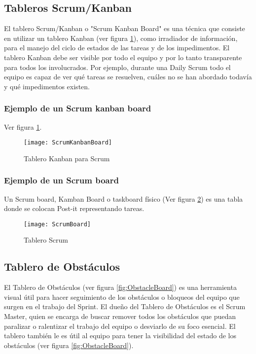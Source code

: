 \subsection{Tableros Scrum/Kanban}

El tablero Scrum/Kanban o "Scrum Kanban Board" es una técnica que consiste en utilizar un tablero Kanban (ver figura \ref{fig:ScrumKanbanBoard}), como irradiador de información, para el manejo del ciclo de estados de las tareas y de los impedimentos. El tablero Kanban debe ser visible por todo el equipo y por lo tanto transparente para todos los involucrados. Por ejemplo, durante una Daily Scrum todo el equipo es capaz de ver qué tareas se resuelven, cuáles no se han abordado todavía y qué impedimentos existen.

\subsubsection{Ejemplo de un Scrum kanban board}

Ver figura \ref{fig:ScrumKanbanBoard}.

\begin{figure}[h]
  \centering
  \texttt{[image: ScrumKanbanBoard]}
  \caption{Tablero Kanban para Scrum}
  \centering
  \label{fig:ScrumKanbanBoard} %
\end{figure}

\subsubsection{Ejemplo de un Scrum board}

Un Scrum board, Kamban Board o taskboard físico (Ver figura \ref{fig:ScrumBoard}) es una tabla donde se colocan Post-it representando tareas.

\begin{figure}[h]
  \centering
  \texttt{[image: ScrumBoard]}
  \caption{Tablero Scrum}
  \centering
  \label{fig:ScrumBoard} %
\end{figure}

\subsection{Tablero de Obstáculos}

El Tablero de Obstáculos (ver figura \ref{fig:ObstacleBoard}) es una herramienta visual útil para hacer seguimiento de los obstáculos o bloqueos del equipo que surgen en el trabajo del Sprint. El dueño del Tablero de Obstáculos es el Scrum Master, quien se encarga de buscar remover todos los obstáculos que puedan paralizar o ralentizar el trabajo del equipo o desviarlo de su foco esencial. El tablero también le es útil al equipo para tener la visibilidad del estado de los obstáculos (ver figura \ref{fig:ObstacleBoard}).

